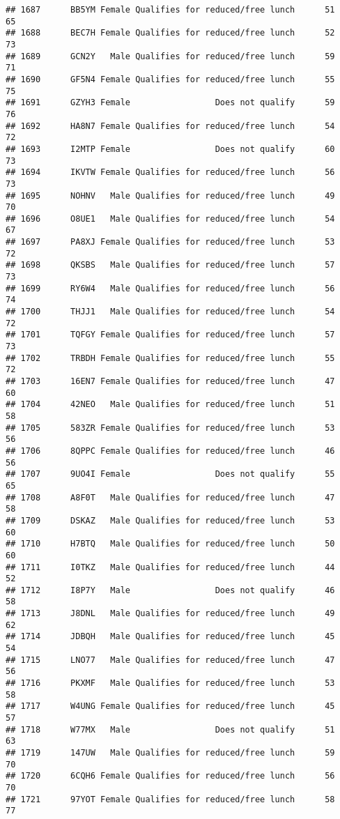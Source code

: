 \documentclass[
]{article}
\begin{document}
\begin{verbatim}
## 1687      BB5YM Female Qualifies for reduced/free lunch      51       65
## 1688      BEC7H Female Qualifies for reduced/free lunch      52       73
## 1689      GCN2Y   Male Qualifies for reduced/free lunch      59       71
## 1690      GF5N4 Female Qualifies for reduced/free lunch      55       75
## 1691      GZYH3 Female                 Does not qualify      59       76
## 1692      HA8N7 Female Qualifies for reduced/free lunch      54       72
## 1693      I2MTP Female                 Does not qualify      60       73
## 1694      IKVTW Female Qualifies for reduced/free lunch      56       73
## 1695      NOHNV   Male Qualifies for reduced/free lunch      49       70
## 1696      O8UE1   Male Qualifies for reduced/free lunch      54       67
## 1697      PA8XJ Female Qualifies for reduced/free lunch      53       72
## 1698      QKSBS   Male Qualifies for reduced/free lunch      57       73
## 1699      RY6W4   Male Qualifies for reduced/free lunch      56       74
## 1700      THJJ1   Male Qualifies for reduced/free lunch      54       72
## 1701      TQFGY Female Qualifies for reduced/free lunch      57       73
## 1702      TRBDH Female Qualifies for reduced/free lunch      55       72
## 1703      16EN7 Female Qualifies for reduced/free lunch      47       60
## 1704      42NEO   Male Qualifies for reduced/free lunch      51       58
## 1705      583ZR Female Qualifies for reduced/free lunch      53       56
## 1706      8QPPC Female Qualifies for reduced/free lunch      46       56
## 1707      9UO4I Female                 Does not qualify      55       65
## 1708      A8F0T   Male Qualifies for reduced/free lunch      47       58
## 1709      DSKAZ   Male Qualifies for reduced/free lunch      53       60
## 1710      H7BTQ   Male Qualifies for reduced/free lunch      50       60
## 1711      I0TKZ   Male Qualifies for reduced/free lunch      44       52
## 1712      I8P7Y   Male                 Does not qualify      46       58
## 1713      J8DNL   Male Qualifies for reduced/free lunch      49       62
## 1714      JDBQH   Male Qualifies for reduced/free lunch      45       54
## 1715      LNO77   Male Qualifies for reduced/free lunch      47       56
## 1716      PKXMF   Male Qualifies for reduced/free lunch      53       58
## 1717      W4UNG Female Qualifies for reduced/free lunch      45       57
## 1718      W77MX   Male                 Does not qualify      51       63
## 1719      147UW   Male Qualifies for reduced/free lunch      59       70
## 1720      6CQH6 Female Qualifies for reduced/free lunch      56       70
## 1721      97YOT Female Qualifies for reduced/free lunch      58       77

\end{verbatim}
\end{document}
